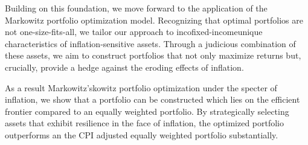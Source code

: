 \documentclass{article}
\begin{document}
Building on this foundation, we move forward to the application of the Markowitz portfolio optimization model. Recognizing that optimal portfolios are not one-size-fits-all, we tailor our approach to incofixed-incomeunique characteristics of inflation-sensitive assets. Through a judicious combination of these assets, we aim to construct portfolios that not only maximize returns but, crucially, provide a hedge against the eroding effects of inflation.

As a result Markowitz'skowitz portfolio optimization under the specter of inflation, we show that a portfolio can be constructed which lies on the efficient frontier compared to an equally weighted portfolio. By strategically selecting assets that exhibit resilience in the face of inflation, the optimized portfolio outperforms an the CPI adjusted equally weighted portfolio substantially.

\newpage
\end{document}

